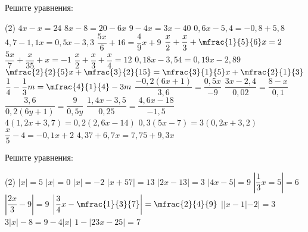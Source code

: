\begin{class}[number=2]
	\begin{listofex}
		\item Решите уравнения: %
		\begin{tasks}(2)
			\task \( 4x-x=24 \)
			\task \( 8x-8=20-6x \)
			\task \( 9-4x=3x-40 \)
			\task \( 0,6x-5,4=-0,8+5,8 \)
			\task \( 4,7-1,1x=0,5x-3,3 \)
			\task \( \dfrac{5x}{6}+16=\dfrac{4}{9}x+9 \)
			\task \( \dfrac{x}{2}+\dfrac{x}{3}+\mfrac{1}{5}{6}x=2 \)
			\task \( \dfrac{5x}{7}+\dfrac{x}{35}+x=-1 \)
			\task \( \dfrac{x}{2}+\dfrac{x}{3}+\dfrac{x}{4}=12 \)
			\task \( 0,18x-3,54=0,19x-2,89 \)
			\task \( \mfrac{2}{2}{5}x+ \mfrac{3}{2}{15}=\mfrac{3}{1}{5}x + \mfrac{2}{1}{3} \)
			\task \( \dfrac{1}{4} - \dfrac{1}{3}m=\mfrac{4}{1}{4}-3m \)
			\task \( \dfrac{-0,2(6x+1)}{3,6}=\dfrac{0,5x}{-9} \)
			\task \( \dfrac{3x-2,4}{0,02}=\dfrac{8-x}{0,1} \)
			\task \( \dfrac{3,6}{0,2(6y+1)}=\dfrac{9}{0,5y} \)
			\task \( \dfrac{1,4x-3,5}{0,25}=\dfrac{4,6x-18}{-1,5} \)
			\task \( 4(1,2x+3,7)=0,2(2,6x-14) \)
			\task \( 0,3(5x-7)=3(0,2x+3,2) \)
			\task \( \dfrac{x}{5}-4=-0,1x+2 \)
			\task \( 4,37+6,7x=7,75+9,3x \)
		\end{tasks}
		\item Решите уравнения: %
		\begin{tasks}(2)
			\task \( |x|=5 \)
			\task \( |x|=0 \)
			\task \( |x|=-2 \)
			\task \( |x+57|=13 \)
			\task \( |2x-13|=3 \)
			\task \( |4x-5|=9 \)
			\task \( \left| \dfrac{1}{3}x=5 \right|=6 \)
			\task \( \left| \dfrac{2x}{3}-9 \right|=9 \)
			\task \( \left| \dfrac{3}{4}x-\mfrac{1}{3}{7} \right|=\mfrac{2}{4}{9} \)
			\task \( ||x-1|-2|=3 \)
			\task \( 3|x|-8=9-4|x| \)
			\task \( 1-|23x-25|=7 \)
		\end{tasks}
	\end{listofex}
\end{class}

